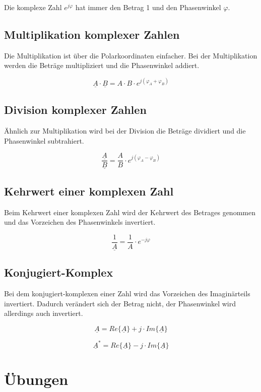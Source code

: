 \documentclass[
  ngerman,
  letterpaper,
]{scrbook}
\begin{document}
Die komplexe Zahl \(e^{j\varphi}\) hat immer den Betrag 1 und den
Phasenwinkel \(\varphi\).

\subsection{Multiplikation komplexer
Zahlen}\label{multiplikation-komplexer-zahlen}

Die Multiplikation ist über die Polarkoordinaten einfacher. Bei der
Multiplikation werden die Beträge multipliziert und die Phasenwinkel
addiert.

\[
\underline{A} \cdot \underline{B} = A \cdot B \cdot e^{j(\varphi_A + \varphi_B)}
\]

\subsection{Division komplexer Zahlen}\label{division-komplexer-zahlen}

Ähnlich zur Multiplikation wird bei der Division die Beträge dividiert
und die Phasenwinkel subtrahiert.

\[
\frac{\underline{A}}{\underline{B}} = \frac{A}{B} \cdot e^{j(\varphi_A - \varphi_B)}
\]

\subsection{Kehrwert einer komplexen
Zahl}\label{kehrwert-einer-komplexen-zahl}

Beim Kehrwert einer komplexen Zahl wird der Kehrwert des Betrages
genommen und das Vorzeichen des Phasenwinkels invertiert.

\[
\frac{1}{\underline{A}} = \frac{1}{A} \cdot e^{-j\varphi}
\]

\subsection{Konjugiert-Komplex}\label{konjugiert-komplex}

Bei dem konjugiert-komplexen einer Zahl wird das Vorzeichen des
Imaginärteils invertiert. Dadurch verändert sich der Betrag nicht, der
Phasenwinkel wird allerdings auch invertiert.

\[\underline{A} = Re\{\underline{A}\} + j \cdot Im\{\underline{A}\}\]

\[\underline{A}^* = Re\{\underline{A}\} - j \cdot Im\{\underline{A}\}\]

\section{Übungen}\label{uxfcbungen}
\end{document}
